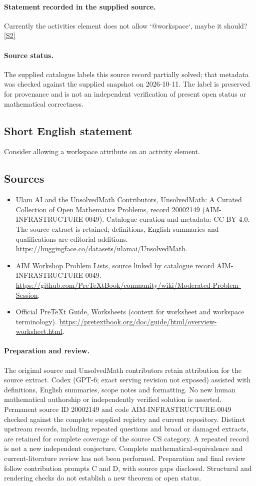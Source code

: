 \documentclass[11pt]{article}
\newcommand{\sref}[2]{\hyperlink{source:#1:#2}{[S#2]}}
\begin{document}
\paragraph{Statement recorded in the supplied source.}
Currently the activities element does not allow `@workspace`, maybe it should? \sref{20002149}{2}
\paragraph{Source status.}
The supplied catalogue labels this source record partially solved; that metadata was checked against the supplied snapshot on 2026-10-11. The label is preserved for provenance and is not an independent verification of present open status or mathematical correctness.
\subsection{Short English statement}
Consider allowing a workspace attribute on an activity element.
\subsection{Sources}
\begin{itemize}
\item[\hypertarget{source:20002149:1}{S1}] Ulam AI and the UnsolvedMath Contributors, UnsolvedMath: A Curated Collection of Open Mathematics Problems, record 20002149 (AIM-INFRASTRUCTURE-0049). Catalogue curation and metadata: CC BY 4.0. The source extract is retained; definitions, English summaries and qualifications are editorial additions.
\url{https://huggingface.co/datasets/ulamai/UnsolvedMath}.
\item[\hypertarget{source:20002149:2}{S2}] AIM Workshop Problem Lists, source linked by catalogue record AIM-INFRASTRUCTURE-0049.
\url{https://github.com/PreTeXtBook/community/wiki/Moderated-Problem-Session}.
\item[\hypertarget{source:20002149:3}{S3}] Official PreTeXt Guide, Worksheets (context for worksheet and workspace terminology).
\url{https://pretextbook.org/doc/guide/html/overview-worksheet.html}.
\end{itemize}
\paragraph{Preparation and review.}
The original source and UnsolvedMath contributors retain attribution for the source extract. Codex (GPT-6; exact serving revision not exposed) assisted with definitions, English summaries, scope notes and formatting. No new human mathematical authorship or independently verified solution is asserted. Permanent source ID 20002149 and code AIM-INFRASTRUCTURE-0049 checked against the complete supplied registry and current repository. Distinct upstream records, including repeated questions and broad or damaged extracts, are retained for complete coverage of the source CS category. A repeated record is not a new independent conjecture. Complete mathematical-equivalence and current-literature review has not been performed. Preparation and final review follow contribution prompts C and D, with source gaps disclosed. Structural and rendering checks do not establish a new theorem or open status.
\label{end:20002149}
\end{document}

